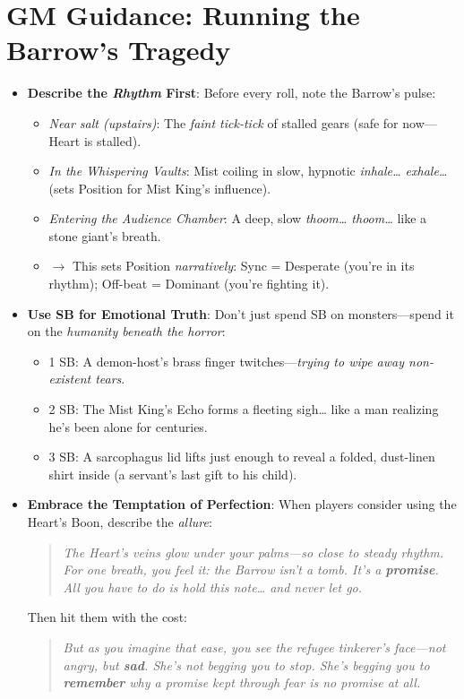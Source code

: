 \documentclass[12pt]{article}
\begin{document}
\section{GM Guidance: Running the Barrow's Tragedy}
\begin{itemize}
  \item \textbf{Describe the \textit{Rhythm} First}: Before every roll, note the Barrow's pulse:
  \begin{itemize}
    \item \textit{Near salt (upstairs)}: The \textit{faint tick-tick} of stalled gears (safe for now---Heart is stalled).
    \item \textit{In the Whispering Vaults}: Mist coiling in slow, hypnotic \textit{inhale\ldots{} exhale\ldots{}} (sets Position for Mist King's influence).
    \item \textit{Entering the Audience Chamber}: A deep, slow \textit{thoom\ldots{} thoom\ldots{}} like a stone giant's breath.
    \item $\rightarrow$ This sets Position \textit{narratively}: Sync = Desperate (you're in its rhythm); Off-beat = Dominant (you're fighting it).
  \end{itemize}
  \item \textbf{Use SB for Emotional Truth}: Don't just spend SB on monsters---spend it on the \textit{humanity beneath the horror}:
  \begin{itemize}
    \item 1 SB: A demon-host's brass finger twitches---\textit{trying to wipe away non-existent tears}.
    \item 2 SB: The Mist King's Echo forms a fleeting sigh\ldots{} like a man realizing he's been alone for centuries.
    \item 3 SB: A sarcophagus lid lifts just enough to reveal a folded, dust-linen shirt inside (a servant's last gift to his child).
  \end{itemize}
  \item \textbf{Embrace the Temptation of Perfection}: When players consider using the Heart's Boon, describe the \textit{allure}:
  \begin{quote}
    \textit{The Heart's veins glow under your palms---so close to steady rhythm. For one breath, you feel it: the Barrow isn't a tomb. It's a \textbf{promise}. All you have to do is hold this note\ldots{} and never let go.}
  \end{quote}
  Then hit them with the cost:
  \begin{quote}
    \textit{But as you imagine that ease, you see the refugee tinkerer's face---not angry, but \textbf{sad}. She's not begging you to stop. She's begging you to \textbf{remember} why a promise kept through fear is no promise at all.}

\end{quote}
\end{itemize}
\end{document}
